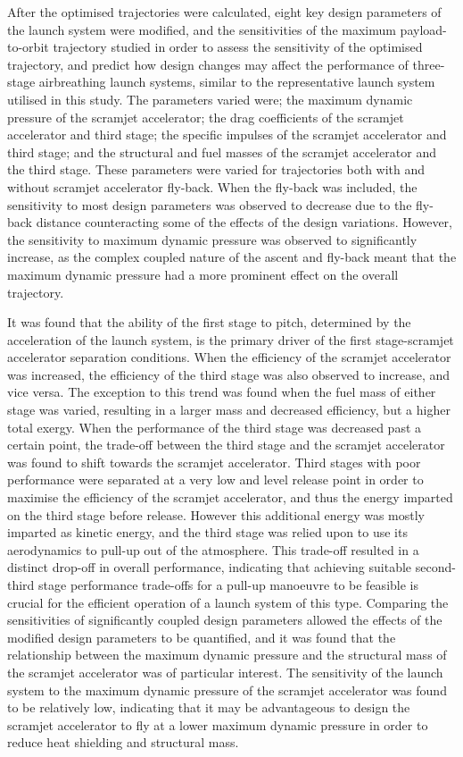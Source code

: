 After the optimised trajectories were calculated, eight key design parameters of the launch system were modified, and the sensitivities of the maximum payload-to-orbit trajectory studied in order to assess the sensitivity of the optimised trajectory, and predict how design changes may affect the performance of three-stage airbreathing launch systems, similar to the representative launch system utilised in this study.
The parameters varied were; the maximum dynamic pressure of the scramjet accelerator; the drag coefficients of the scramjet accelerator and third stage; the specific impulses of the scramjet accelerator and third stage; and the structural and fuel masses of the scramjet accelerator and the third stage. 
These parameters were varied for trajectories both with and without scramjet accelerator fly-back. When the fly-back was included, the sensitivity to most design parameters was observed to decrease due to the fly-back distance counteracting some of the effects of the design variations. However, the sensitivity to maximum dynamic pressure was observed to significantly increase, as the complex coupled nature of the ascent and fly-back meant that the maximum dynamic pressure had a more prominent effect on the overall trajectory. 

It was found that the ability of the first stage to pitch, determined by the acceleration of the launch system, is the primary driver of the first stage-scramjet accelerator separation conditions. 
When the efficiency of the scramjet accelerator was increased, the efficiency of the third stage was also observed to increase, and vice versa. The exception to this trend was found when the fuel mass of either stage was varied, resulting in a larger mass and decreased efficiency, but a higher total exergy.
When the performance of the third stage was decreased past a certain point, the trade-off between the third stage and the scramjet accelerator was found to shift towards the scramjet accelerator. Third stages with poor performance were separated at a very low and level release point in order to maximise the efficiency of the scramjet accelerator, and thus the energy imparted on the third stage before release. However this additional energy was mostly imparted as kinetic energy, and the third stage was relied upon to use its aerodynamics to pull-up out of the atmosphere. This trade-off resulted in a distinct drop-off in overall performance, indicating that achieving suitable second-third stage performance trade-offs for a pull-up manoeuvre to be feasible is crucial for the efficient operation of a launch system of this type.  
Comparing the sensitivities of significantly coupled design parameters allowed the effects of the modified design parameters to be quantified, and it was found that the relationship between the maximum dynamic pressure and the structural mass of the scramjet accelerator was of particular interest. 
The sensitivity of the launch system to the maximum dynamic pressure of the scramjet accelerator was found to be relatively low, indicating that it may be advantageous to design the scramjet accelerator to fly at a lower maximum dynamic pressure in order to reduce heat shielding and structural mass. 


